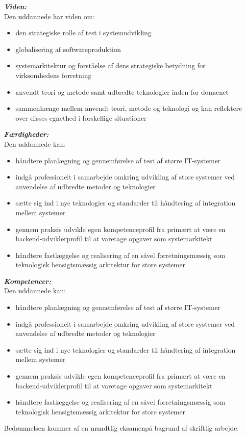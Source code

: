 \documentclass{report}
\begin{document}
\noindent\textbf{\textit{Viden:}}\\
Den uddannede har viden om:
\begin{itemize}
    \item den strategiske rolle af test i systemudvikling
    \item globalisering af softwareproduktion
    \item systemarkitektur og forståelse af dens strategiske betydning for virksomhedens forretning
    \item anvendt teori og metode samt udbredte teknologier inden for domænet
    \item sammenhænge mellem anvendt teori, metode og teknologi og kan reflektere over disses egnethed i forskellige situationer
\end{itemize}
\noindent\textbf{\textit{Færdigheder:}}\\
Den uddannede kan:
\begin{itemize}
    \item håndtere planlægning og gennemførelse af test af større IT-systemer
    \item indgå professionelt i samarbejde omkring udvikling af store systemer ved anvendelse af udbredte metoder og teknologier
    \item sætte sig ind i nye teknologier og standarder til håndtering af integration mellem systemer
    \item gennem praksis udvikle egen kompetenceprofil fra primært at være en backend-udviklerprofil til at varetage opgaver som systemarkitekt
    \item håndtere fastlæggelse og realisering af en såvel forretningsmæssig som teknologisk hensigtsmæssig arkitektur for store systemer
\end{itemize}
\noindent\textbf{\textit{Kompetencer:}}\\
Den uddannede kan:
\begin{itemize}
    \item håndtere planlægning og gennemførelse af test af større IT-systemer
    \item indgå professionelt i samarbejde omkring udvikling af store systemer ved anvendelse af udbredte metoder og teknologier
    \item sætte sig ind i nye teknologier og standarder til håndtering af integration mellem systemer
    \item gennem praksis udvikle egen kompetenceprofil fra primært at være en backend-udviklerprofil til at varetage opgaver som systemarkitekt
    \item håndtere fastlæggelse og realisering af en såvel forretningsmæssig som teknologisk hensigtsmæssig arkitektur for store systemer
\end{itemize}

\noindent Bedømmelsen kommer af en mundtlig eksamenpå bagrund af skriftlig arbejde.\\
\end{document}
